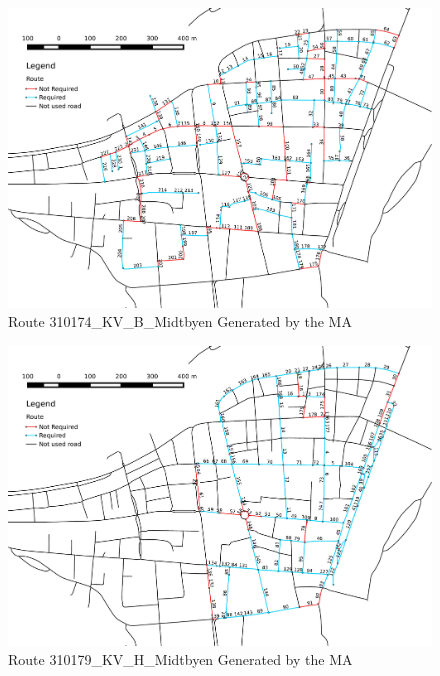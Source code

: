 \begin{landscape}
\begin{figure}[thbp]
	\centerline{\includegraphics[height=0.945\textwidth]{figures/Routes/Drawn/Rute_KV_B_Generert_Proper_Run.pdf}}
	\caption{Route 310174\_KV\_B\_Midtbyen Generated by the MA}
	\label{fig:KV_B_drawn}
\end{figure}
\end{landscape}

\begin{landscape}
\begin{figure}[thbp]
	\centerline{\includegraphics[height=0.945\textwidth]{figures/Routes/Drawn/Rute_KV_H_Generert_Proper_Run.pdf}}
	\caption{Route 310179\_KV\_H\_Midtbyen Generated by the MA}
	\label{fig:KV_H_drawn}
\end{figure}
\end{landscape}

